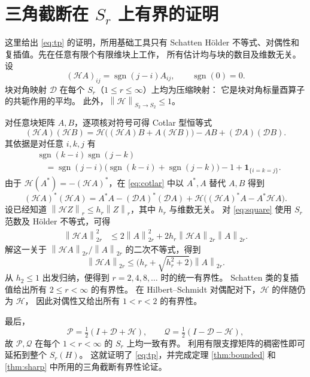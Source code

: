 \documentclass[UTF8,11pt,a4paper,fontset=fandol]{ctexart}
\theoremstyle{remark}
\newcommand{\PP}{\mathcal P}
\newcommand{\QQ}{\mathcal Q}
\newcommand{\DD}{\mathcal D}
\newcommand{\TriH}{\mathcal H}
\newcommand{\norm}[1]{\left\lVert #1\right\rVert}
\numberwithin{equation}{section}
\begin{document}
\appendix
\section{三角截断在 \texorpdfstring{$S_r$}{Sr} 上有界的证明}

这里给出 \eqref{eq:tp} 的证明，所用基础工具只有 Schatten H\"older
不等式、对偶性和复插值。先在任意有限个有限维块上工作，
所有估计均与块的数目及维数无关。
设
\[
 (\TriH A)_{ij}=\operatorname{sgn}(j-i)A_{ij},\qquad
 \operatorname{sgn}(0)=0.
\]
块对角映射 $\DD$ 在每个 $S_r$（$1\leq r\leq\infty$）上均为压缩映射：
它是块对角标量酉算子的共轭作用的平均。
此外，$\norm{\TriH}_{S_2\to S_2}\leq1$。

\medskip
对任意块矩阵 $A,B$，逐项核对符号可得 Cotlar 型恒等式
\begin{equation}\label{eq:cotlar}
 (\TriH A)(\TriH B)
 =\TriH\bigl((\TriH A)B+A(\TriH B)\bigr)-AB+(\DD A)(\DD B).
\end{equation}
其依据是对任意 $i,k,j$ 有
\begin{align*}
 &\operatorname{sgn}(k-i)\operatorname{sgn}(j-k)\\
 &\quad=\operatorname{sgn}(j-i)
   \bigl(\operatorname{sgn}(k-i)+\operatorname{sgn}(j-k)\bigr)
    -1+\mathbf1_{\{i=k=j\}}.
\end{align*}
由于 $\TriH(A^*)=-(\TriH A)^*$，在 \eqref{eq:cotlar} 中以 $A^*,A$
替代 $A,B$ 得到
\begin{equation}\label{eq:square}
 (\TriH A)^*(\TriH A)
 =A^*A-(\DD A)^*(\DD A)
   +\TriH\bigl((\TriH A)^*A-A^*\TriH A\bigr).
\end{equation}
设已经知道 $\norm{\TriH Z}_r\leq h_r\norm Z_r$，其中 $h_r$ 与维数无关。
对 \eqref{eq:square} 使用 $S_r$ 范数及 H\"older 不等式，可得
\begin{align*}
 \norm{\TriH A}_{2r}^{2}
 &\leq 2\norm A_{2r}^{2}
       +2h_r\norm{\TriH A}_{2r}\norm A_{2r}.
\end{align*}
解这一关于 $\norm{\TriH A}_{2r}/\norm A_{2r}$ 的二次不等式，得到
\[
 \norm{\TriH A}_{2r}\leq
 \bigl(h_r+\sqrt{h_r^2+2}\bigr)\norm A_{2r}.
\]
从 $h_2\leq1$ 出发归纳，便得到 $r=2,4,8,\ldots$ 时的统一有界性。
Schatten 类的复插值给出所有 $2\leq r<\infty$ 的有界性。
在 Hilbert--Schmidt 对偶配对下，$\TriH$ 的伴随仍为 $\TriH$，
因此对偶性又给出所有 $1<r<2$ 的有界性。

最后，
\[
 \PP=\tfrac12(I+\DD+\TriH),\qquad
 \QQ=\tfrac12(I-\DD-\TriH),
\]
故 $\PP,\QQ$ 在每个 $1<r<\infty$ 的 $S_r$ 上均一致有界。
利用有限支撑矩阵的稠密性即可延拓到整个 $S_r(H)$。
这就证明了 \eqref{eq:tp}，并完成定理 \ref{thm:bounded} 和
\ref{thm:sharp} 中所用的三角截断有界性论证。
\end{document}
